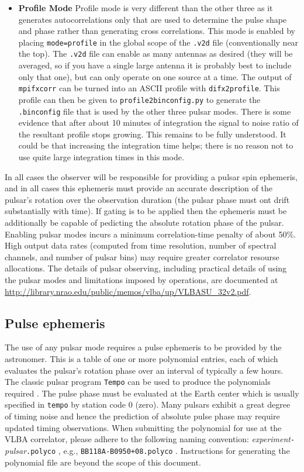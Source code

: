 \begin{itemize}
\item \label{psrmode:profile} {\bf Profile Mode}
Profile mode is very different than the other three as it generates autocorrelations only that are used to determine the pulse shape and phase rather than generating cross correlations.
This mode is enabled by placing {\tt mode=profile} in the global scope of the {\tt .v2d} file (conventionally near the top).
The {\tt .v2d} file can enable as many antennas as desired (they will be averaged, so if you have a single large antenna it is probably best to include only that one), but can only operate on one source at a time.
The output of {\tt mpifxcorr} can be turned into an ASCII profile with {\tt difx2profile}.
This profile can then be given to {\tt profile2binconfig.py} to generate the {\tt .binconfig} file that is used by the other three pulsar modes.
There is some evidence that after about 10 minutes of integration the signal to noise ratio of the resultant profile stops growing.
This remains to be fully understood.
It could be that increasing the integration time helps; there is no reason not to use quite large integration times in this mode.

\end{itemize}

In all cases the observer will be responsible for providing a pulsar
spin ephemeris, and in all cases this ephemeris must provide an accurate
description of the pulsar's rotation over the observation duration (the pulsar 
phase must ont drift substantially with time).  If gating is to be applied then 
the ephemeris must be additionally be capable
of pedicting the absolute rotation phase of the pulsar.
Enabling pulsar modes incurs a minimum correlation-time penalty of
about 50\%.  High output data rates (computed from time resolution,
number of spectral channels, and number of pulsar bins) may require 
greater correlator resourse allocations.
The details of pulsar observing, including practical details of using
the pulsar modes and limitations imposed by operations, 
are documented at \url{http://library.nrao.edu/public/memos/vlba/up/VLBASU_32v2.pdf}.

\subsection{Pulse ephemeris}

The use of any pulsar mode requires a pulse ephemeris to be provided by the astronomer.  
This is a table of one or more polynomial entries, each of which evaluates the pulsar's rotation phase over an interval of typically a few hours.
The classic pulsar program {\tt Tempo} can be used to produce the polynomials required \cite{tempo}.
The pulse phase must be evaluated at the Earth center which is usually specified in {\tt tempo} by station code 0 (zero).
Many pulsars exhibit a great degree of timing noise and hence the prediction of absolute pulse phase may require updated timing observations.
When submitting the polynomial for use at the VLBA correlator, please adhere to the following naming convention: {\em experiment}{\tt -}{\em pulsar}{\tt .polyco} , e.g., {\tt BB118A-B0950+08.polyco} .
Instructions for generating the polynomial file are beyond the scope of this document.

